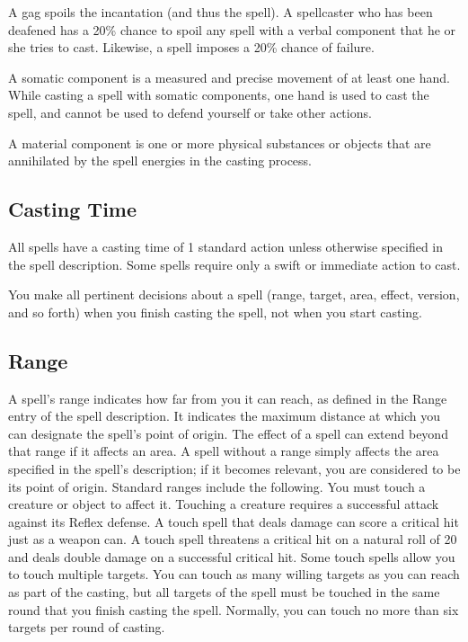         A gag spoils the incantation (and thus the spell). A spellcaster who has been deafened has a 20\% chance to spoil any spell with a verbal component that he or she tries to cast. Likewise, a  spell imposes a 20\% chance of failure.

         A somatic component is a measured and precise movement of at least one hand.
        While casting a spell with somatic components, one hand is used to cast the spell, and cannot be used to defend yourself or take other actions.

         A material component is one or more physical substances or objects that are annihilated by the spell energies in the casting process.

    \subsection{Casting Time}
        All spells have a casting time of 1 standard action unless otherwise specified in the spell description. Some spells require only a swift or immediate action to cast.

        You make all pertinent decisions about a spell (range, target, area, effect, version, and so forth) when you finish casting the spell, not when you start casting.

    \subsection{Range}
        A spell's range indicates how far from you it can reach, as defined in the Range entry of the spell description. It indicates the maximum distance at which you can designate the spell's point of origin. The effect of a spell can extend beyond that range if it affects an area. A spell without a range simply affects the area specified in the spell's description; if it becomes relevant, you are considered to be its point of origin. Standard ranges include the following.
         You must touch a creature or object to affect it. Touching a creature requires a successful attack against its Reflex defense. A touch spell that deals damage can score a critical hit just as a weapon can. A touch spell threatens a critical hit on a natural roll of 20 and deals double damage on a successful critical hit. Some touch spells allow you to touch multiple targets. You can touch as many willing targets as you can reach as part of the casting, but all targets of the spell must be touched in the same round that you finish casting the spell. Normally, you can touch no more than six targets per round of casting.

